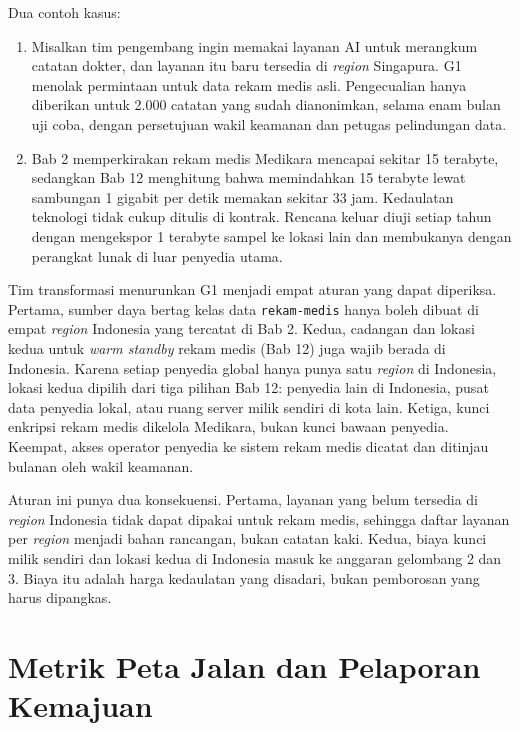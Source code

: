 Dua contoh kasus:
\begin{enumerate}
  \item Misalkan tim pengembang ingin memakai layanan AI untuk merangkum catatan dokter, dan layanan
        itu baru tersedia di \textit{region} Singapura. G1 menolak permintaan untuk data rekam medis
        asli. Pengecualian hanya diberikan untuk 2.000 catatan yang sudah dianonimkan, selama enam
        bulan uji coba, dengan persetujuan wakil keamanan dan petugas pelindungan data.
  \item Bab 2 memperkirakan rekam medis Medikara mencapai sekitar 15 terabyte, sedangkan Bab 12
        menghitung bahwa memindahkan 15 terabyte lewat sambungan 1 gigabit per detik memakan sekitar
        33 jam. Kedaulatan teknologi tidak cukup ditulis di kontrak. Rencana keluar diuji setiap
        tahun dengan mengekspor 1 terabyte sampel ke lokasi lain dan membukanya dengan perangkat
        lunak di luar penyedia utama.
\end{enumerate}

\begin{kasus}[title={Kasus Medikara Health: Guardrail Lokasi Data untuk Rekam Medis Elektronik}]
  Tim transformasi menurunkan G1 menjadi empat aturan yang dapat diperiksa. Pertama, sumber daya
  bertag kelas data \texttt{rekam-medis} hanya boleh dibuat di empat \textit{region} Indonesia yang
  tercatat di Bab 2. Kedua, cadangan dan lokasi kedua untuk \textit{warm standby} rekam medis (Bab
  12) juga wajib berada di Indonesia. Karena setiap penyedia global hanya punya satu \textit{region}
  di Indonesia, lokasi kedua dipilih dari tiga pilihan Bab 12: penyedia lain di Indonesia, pusat
  data penyedia lokal, atau ruang server milik sendiri di kota lain. Ketiga, kunci enkripsi rekam
  medis dikelola Medikara, bukan kunci bawaan penyedia. Keempat, akses operator penyedia ke sistem
  rekam medis dicatat dan ditinjau bulanan oleh wakil keamanan.

  Aturan ini punya dua konsekuensi. Pertama, layanan yang belum tersedia di \textit{region}
  Indonesia tidak dapat dipakai untuk rekam medis, sehingga daftar layanan per \textit{region}
  menjadi bahan rancangan, bukan catatan kaki. Kedua, biaya kunci milik sendiri dan lokasi kedua di
  Indonesia masuk ke anggaran gelombang 2 dan 3. Biaya itu adalah harga kedaulatan yang disadari,
  bukan pemborosan yang harus dipangkas.
\end{kasus}

\section{Metrik Peta Jalan dan Pelaporan Kemajuan}
\label{sec:ch14-metrik}

